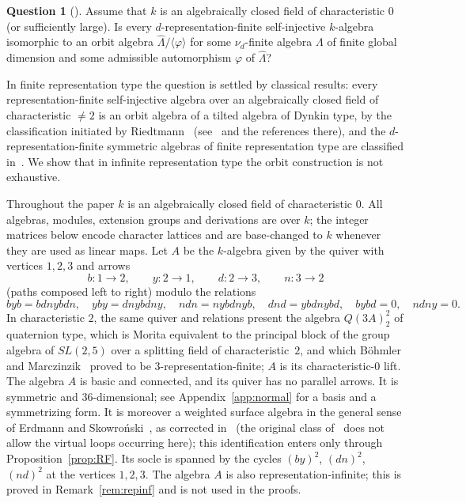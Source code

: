 \documentclass[11pt]{amsart}
\theoremstyle{plain}
\theoremstyle{definition}
\newtheorem{question}[theorem]{Question}
\newcommand{\rep}{\widehat{\Lambda}}
\begin{document}
\begin{question}[{\cite[Question~6.3]{DI}}]\label{q:DI}
Assume that $k$ is an algebraically closed field of characteristic $0$ (or sufficiently large). Is every
$d$-representation-finite self-injective $k$-algebra isomorphic to an orbit algebra
$\rep/\langle\varphi\rangle$ for some $\nu_d$-finite algebra $\Lambda$ of finite global dimension and some
admissible automorphism $\varphi$ of $\rep$?
\end{question}

In finite representation type the question is settled by classical results: every representation-finite
self-injective algebra over an algebraically closed field of characteristic $\neq 2$ is an orbit algebra of a
tilted algebra of Dynkin type, by the classification initiated by Riedtmann~\cite{Riedtmann}
(see~\cite[Theorem~1.1]{DI} and the references there), and the $d$-representation-finite symmetric algebras of
finite representation type are classified in~\cite{DK}. We show that in infinite representation type the orbit
construction is not exhaustive.

Throughout the paper $k$ is an algebraically closed field of characteristic $0$. All algebras, modules,
extension groups and derivations are over $k$; the integer matrices below encode character lattices and are
base-changed to $k$ whenever they are used as linear maps. Let $A$ be the $k$-algebra given by the quiver with
vertices $1,2,3$ and arrows
\[
  b\colon 1\to 2,\qquad y\colon 2\to 1,\qquad d\colon 2\to 3,\qquad n\colon 3\to 2
\]
(paths composed left to right) modulo the relations
\begin{equation}\label{eq:relations}
  byb=bdnybdn,\quad yby=dnybdny,\quad ndn=nybdnyb,\quad dnd=ybdnybd,\quad bybd=0,\quad ndny=0 .
\end{equation}
In characteristic $2$, the same quiver and relations present the algebra $Q(3A)^2_2$ of quaternion type, which
is Morita equivalent to the principal block of the group algebra of $SL(2,5)$ over a splitting field of
characteristic~$2$, and which Böhmler and Marczinzik~\cite{BM} proved to be $3$-representation-finite; $A$ is
its characteristic-$0$ lift. The algebra $A$ is basic and connected, and its quiver has no parallel arrows. It
is symmetric and $36$-dimensional; see Appendix~\ref{app:normal} for a basis and a symmetrizing form. It is
moreover a weighted surface algebra in the general sense of Erdmann and Skowroński~\cite{ErdmannSkowronskiGV},
as corrected in~\cite{ErdmannSkowronskiCorr} (the original class of~\cite{ErdmannSkowronski} does not allow
the virtual loops occurring here); this identification enters only through Proposition~\ref{prop:RF}. Its
socle is spanned by the cycles $(by)^2$, $(dn)^2$, $(nd)^2$ at the vertices $1,2,3$. The algebra $A$ is also
representation-infinite; this is proved in Remark~\ref{rem:repinf} and is not used in the proofs.
\end{document}
